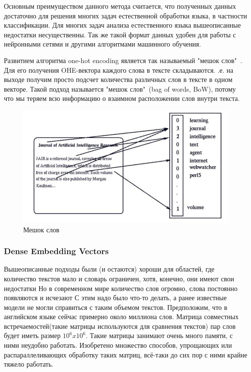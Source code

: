 Основным преимуществом данного метода считается, что полученных данных достаточно для решения многих задач естественной обработки языка\cite{Book26}, в частности классификации. Для многих задач анализа естественного языка вышеописанные недостатки несущественны. Так же такой формат данных удобен для работы с нейронными сетями и другими алгоритмами машинного обучения.

Развитием алгоритма one-hot encoding является так называемый "мешок слов"\ . Для его получения OHE-вектора каждого слова в тексте складываются. .е. на выходе получим просто подсчет количества различных слов в тексте в одном векторе. Такой подход называется "мешок слов"\ (bag of words, BoW), потому что мы теряем всю информацию о взаимном расположении слов внутри текста.
\begin{figure}[!h]
	\centering
	\includegraphics[width=.5\textwidth]{master_img/wordbag.jpg}
	\caption{Мешок слов}
	\label{fig03_master}
\end{figure}
\subsubsection{Dense Embedding Vectors}

Вышеописанные подходы были (и остаются) хороши для областей, где количество текстов мало и словарь ограничен, хотя, конечно, они имеют свои недостатки Но в современном мире количество слов огромно, слова постоянно появляются и исчезают С этим надо было что-то делать, а ранее известные модели не могли справиться с таким объемом текстов. Предположим, что в английском языке сейчас примерно около миллиона слов. Матрица совместных встречаемостей(такие матрицы используются для сравнения текстов) пар слов будет  иметь размер $10^6 x 10^6$. Такие матрицы занимают очень много памяти, с ними неудобно работать. Изобретено множество способов, упрощающих или распараллеливающих обработку таких матриц, всё-таки до сих пор с ними крайне тяжело работать\cite{Book27}.

